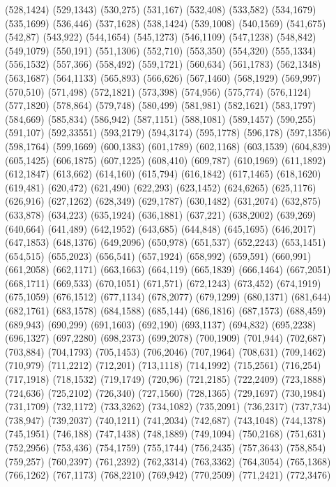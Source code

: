(528,1424)
(529,1343)
(530,275)
(531,167)
(532,408)
(533,582)
(534,1679)
(535,1699)
(536,446)
(537,1628)
(538,1424)
(539,1008)
(540,1569)
(541,675)
(542,87)
(543,922)
(544,1654)
(545,1273)
(546,1109)
(547,1238)
(548,842)
(549,1079)
(550,191)
(551,1306)
(552,710)
(553,350)
(554,320)
(555,1334)
(556,1532)
(557,366)
(558,492)
(559,1721)
(560,634)
(561,1783)
(562,1348)
(563,1687)
(564,1133)
(565,893)
(566,626)
(567,1460)
(568,1929)
(569,997)
(570,510)
(571,498)
(572,1821)
(573,398)
(574,956)
(575,774)
(576,1124)
(577,1820)
(578,864)
(579,748)
(580,499)
(581,981)
(582,1621)
(583,1797)
(584,669)
(585,834)
(586,942)
(587,1151)
(588,1081)
(589,1457)
(590,255)
(591,107)
(592,33551)
(593,2179)
(594,3174)
(595,1778)
(596,178)
(597,1356)
(598,1764)
(599,1669)
(600,1383)
(601,1789)
(602,1168)
(603,1539)
(604,839)
(605,1425)
(606,1875)
(607,1225)
(608,410)
(609,787)
(610,1969)
(611,1892)
(612,1847)
(613,662)
(614,160)
(615,794)
(616,1842)
(617,1465)
(618,1620)
(619,481)
(620,472)
(621,490)
(622,293)
(623,1452)
(624,6265)
(625,1176)
(626,916)
(627,1262)
(628,349)
(629,1787)
(630,1482)
(631,2074)
(632,875)
(633,878)
(634,223)
(635,1924)
(636,1881)
(637,221)
(638,2002)
(639,269)
(640,664)
(641,489)
(642,1952)
(643,685)
(644,848)
(645,1695)
(646,2017)
(647,1853)
(648,1376)
(649,2096)
(650,978)
(651,537)
(652,2243)
(653,1451)
(654,515)
(655,2023)
(656,541)
(657,1924)
(658,992)
(659,591)
(660,991)
(661,2058)
(662,1171)
(663,1663)
(664,119)
(665,1839)
(666,1464)
(667,2051)
(668,1711)
(669,533)
(670,1051)
(671,571)
(672,1243)
(673,452)
(674,1919)
(675,1059)
(676,1512)
(677,1134)
(678,2077)
(679,1299)
(680,1371)
(681,644)
(682,1761)
(683,1578)
(684,1588)
(685,144)
(686,1816)
(687,1573)
(688,459)
(689,943)
(690,299)
(691,1603)
(692,190)
(693,1137)
(694,832)
(695,2238)
(696,1327)
(697,2280)
(698,2373)
(699,2078)
(700,1909)
(701,944)
(702,687)
(703,884)
(704,1793)
(705,1453)
(706,2046)
(707,1964)
(708,631)
(709,1462)
(710,979)
(711,2212)
(712,201)
(713,1118)
(714,1992)
(715,2561)
(716,254)
(717,1918)
(718,1532)
(719,1749)
(720,96)
(721,2185)
(722,2409)
(723,1888)
(724,636)
(725,2102)
(726,340)
(727,1560)
(728,1365)
(729,1697)
(730,1984)
(731,1709)
(732,1172)
(733,3262)
(734,1082)
(735,2091)
(736,2317)
(737,734)
(738,947)
(739,2037)
(740,1211)
(741,2034)
(742,687)
(743,1048)
(744,1378)
(745,1951)
(746,188)
(747,1438)
(748,1889)
(749,1094)
(750,2168)
(751,631)
(752,2956)
(753,436)
(754,1759)
(755,1744)
(756,2435)
(757,3643)
(758,854)
(759,257)
(760,2397)
(761,2392)
(762,3314)
(763,3362)
(764,3054)
(765,1368)
(766,1262)
(767,1173)
(768,2210)
(769,942)
(770,2509)
(771,2421)
(772,3476)
